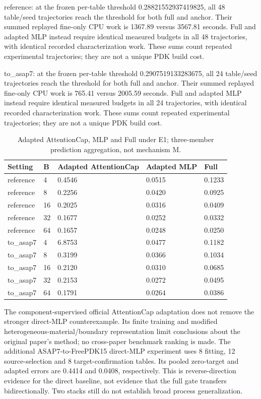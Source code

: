 \documentclass[10pt,twocolumn]{article}
\begin{document}
reference: at the frozen per-table threshold 0.28821552937419825, all 48 table/seed trajectories reach the threshold for both full and anchor. Their summed replayed fine-only CPU work is 1367.89 versus 3567.81 seconds. Full and adapted MLP instead require identical measured budgets in all 48 trajectories, with identical recorded characterization work. These sums count repeated experimental trajectories; they are not a unique PDK build cost.

to\_asap7: at the frozen per-table threshold 0.2907519133283675, all 24 table/seed trajectories reach the threshold for both full and anchor. Their summed replayed fine-only CPU work is 765.41 versus 2005.59 seconds. Full and adapted MLP instead require identical measured budgets in all 24 trajectories, with identical recorded characterization work. These sums count repeated experimental trajectories; they are not a unique PDK build cost.

\begin{table}[t]\centering\small{\begin{tabular}{lllll}\toprule
Setting & B & Adapted AttentionCap & Adapted MLP & Full\\\midrule
reference & 4 & 0.4546 & 0.0515 & 0.1233\\
reference & 8 & 0.2256 & 0.0420 & 0.0925\\
reference & 16 & 0.2025 & 0.0316 & 0.0409\\
reference & 32 & 0.1677 & 0.0252 & 0.0332\\
reference & 64 & 0.1657 & 0.0248 & 0.0250\\
to\_asap7 & 4 & 6.8753 & 0.0477 & 0.1182\\
to\_asap7 & 8 & 0.3199 & 0.0366 & 0.1034\\
to\_asap7 & 16 & 0.2120 & 0.0310 & 0.0685\\
to\_asap7 & 32 & 0.2153 & 0.0272 & 0.0495\\
to\_asap7 & 64 & 0.1791 & 0.0264 & 0.0386\\
\bottomrule\end{tabular}}\caption{Adapted AttentionCap, MLP and Full under E1; three-member prediction aggregation, not mechanism M.}\end{table}


The component-supervised official AttentionCap adaptation does not remove the stronger direct-MLP counterexample. Its finite training and modified heterogeneous-material/boundary representation limit conclusions about the original paper's method; no cross-paper benchmark ranking is made. The additional ASAP7-to-FreePDK15 direct-MLP experiment uses 8 fitting, 12 source-selection and 8 target-confirmation tables. Its pooled zero-target and adapted errors are 0.4414 and 0.0408, respectively. This is reverse-direction evidence for the direct baseline, not evidence that the full gate transfers bidirectionally. Two stacks still do not establish broad process generalization.
\end{document}
